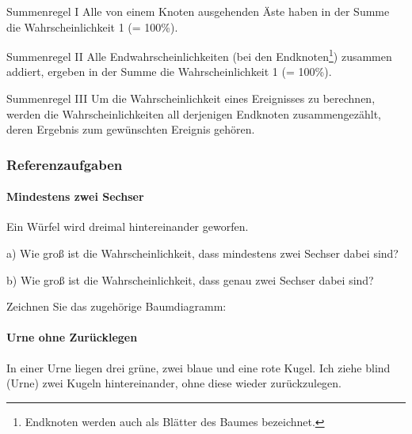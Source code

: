 \begin{gesetz}{Summenregel I}{}
Alle von einem Knoten ausgehenden Äste haben in der Summe die Wahrscheinlichkeit 1 (= 100\%).
\end{gesetz}

\begin{gesetz}{Summenregel II}{}
Alle Endwahrscheinlichkeiten (bei den Endknoten\footnote{Endknoten werden auch als Blätter des Baumes bezeichnet.}) zusammen addiert, ergeben in der Summe die Wahrscheinlichkeit 1 (= 100\%).
\end{gesetz}

\begin{gesetz}{Summenregel III}{}
  Um die Wahrscheinlichkeit eines Ereignisses zu berechnen, werden die
  Wahrscheinlichkeiten all derjenigen Endknoten zusammengezählt, deren Ergebnis zum gewünschten Ereignis gehören.
  \end{gesetz}

\newpage


\subsubsection{Referenzaufgaben}

\paragraph{Mindestens zwei Sechser} Ein Würfel wird dreimal hintereinander geworfen.

a) Wie groß ist die Wahrscheinlichkeit, dass mindestens zwei Sechser dabei sind?

b) Wie groß ist die Wahrscheinlichkeit, dass genau zwei Sechser dabei sind?

Zeichnen Sie das zugehörige Baumdiagramm:

\newpage


\paragraph{Urne ohne Zurücklegen} In einer Urne liegen drei grüne, zwei blaue und eine rote Kugel. Ich ziehe blind (Urne) zwei Kugeln hintereinander, ohne diese wieder zurückzulegen.

